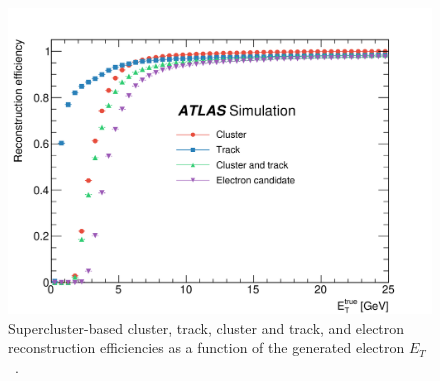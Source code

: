 \begin{figure}[h]
    \centering
    \includegraphics[width=\mediumfigwidth]{images/supercluster_reco.png}
    \caption[Supercluster-based cluster, track, cluster and track, and electron reconstruction efficiencies as a function of the generated electron $E_T$ ]{Supercluster-based cluster, track, cluster and track, and electron reconstruction efficiencies as a function of the generated electron $E_T$~\cite{Aad:2019tso}.}
    \label{fig:method:screco}
\end{figure}

